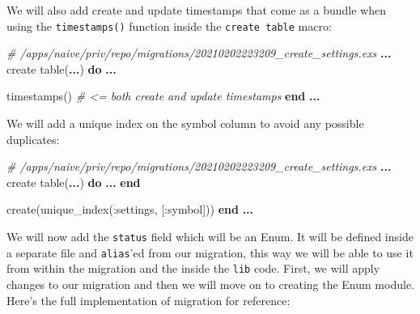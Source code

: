 \documentclass[
  oneside]{book}
\newenvironment{Shaded}{\begin{snugshade}}{\end{snugshade}}
\newcommand{\CommentTok}[1]{\textcolor[rgb]{0.56,0.35,0.01}{\textit{#1}}}
\newcommand{\KeywordTok}[1]{\textcolor[rgb]{0.13,0.29,0.53}{\textbf{#1}}}
\newcommand{\NormalTok}[1]{#1}
\newcommand{\OperatorTok}[1]{\textcolor[rgb]{0.81,0.36,0.00}{\textbf{#1}}}
\newcommand{\VariableTok}[1]{\textcolor[rgb]{0.00,0.00,0.00}{#1}}
\begin{document}
We will also add create and update timestamps that come as a bundle when using the \texttt{timestamps()} function inside the \texttt{create\ table} macro:

\begin{Shaded}
\begin{Highlighting}[]
\CommentTok{\# /apps/naive/priv/repo/migrations/20210202223209\_create\_settings.exs}
\OperatorTok{...}
\NormalTok{    create table(}\OperatorTok{...}\NormalTok{) }\KeywordTok{do}
      \OperatorTok{...}

\NormalTok{      timestamps() }\CommentTok{\# \textless{}= both create and update timestamps}
    \KeywordTok{end}
    \OperatorTok{...}
\end{Highlighting}
\end{Shaded}

We will add a unique index on the symbol column to avoid any possible duplicates:

\begin{Shaded}
\begin{Highlighting}[]
\CommentTok{\# /apps/naive/priv/repo/migrations/20210202223209\_create\_settings.exs}
\OperatorTok{...}
\NormalTok{    create table(}\OperatorTok{...}\NormalTok{) }\KeywordTok{do}
      \OperatorTok{...}
    \KeywordTok{end}

\NormalTok{    create(unique\_index(}\VariableTok{:settings}\NormalTok{, [}\VariableTok{:symbol}\NormalTok{]))}
  \KeywordTok{end}
\OperatorTok{...}
\end{Highlighting}
\end{Shaded}

We will now add the \texttt{status} field which will be an Enum. It will be defined inside a separate file and \texttt{alias}'ed from our migration, this way we will be able to use it from within the migration and the inside the \texttt{lib} code. First, we will apply changes to our migration and then we will move on to creating the Enum module.
Here's the full implementation of migration for reference:
\end{document}
